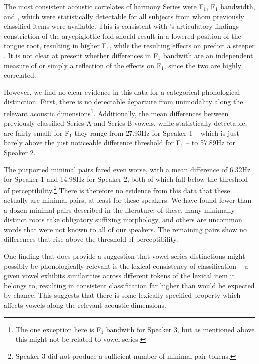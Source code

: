 \documentclass[output=paper,newtxmath,modfonts,nonflat,hidelinks]{langsci/langscibook}
\begin{document}
The most consistent acoustic correlates of harmony Series were F$_1$, F$_1$ bandwidth, and , which were statistically detectable for all subjects from whom previously classified items were available.  This is consistent with \cite{Edmondsonetal2004}'s articulatory findings -- constriction of the aryepiglottic fold should result in a lowered position of the tongue root, resulting in higher F$_1$, while the resulting effects on  predict a steeper .  It is not clear at present whether differences in F$_1$ bandwith are an independent measure of  or simply a reflection of the effects on F$_1$, since the two are highly correlated.  

However, we find no clear evidence in this data for a categorical phonological distinction.  First, there is no detectable departure from unimodality along the relevant acoustic dimensions\footnote{The one exception here is F$_1$ bandwith for Speaker 3, but as mentioned above this might not be related to vowel series.}.  Additionally, the mean differences between previously-classified Series A and Series B vowels, while statistically detectable, are fairly small; for F$_1$ they range from 27.93Hz for Speaker 1 --  which is just barely above the just noticeable difference threshold for F$_1$ \citep{KewleyPort1995} -- to 57.89Hz for Speaker 2.  

The purported minimal pairs fared even worse, with a mean difference of 6.32Hz for Speaker 1 and 14.98Hz for Speaker 2, both of which fall below the threshold of perceptibility.\footnote{Speaker 3 did not produce a sufficient number of minimal pair tokens.}  There is therefore no evidence from this data that these actually are minimal pairs, at least for these speakers.  We have found fewer than a dozen minimal pairs described in the literature; of these, many minimally-distinct roots take obligatory suffixing morphology, and others are uncommon words that were not known to all of our speakers.  The remaining pairs show no differences that rise above the threshold of perceptibility.

One finding that does provide a suggestion that vowel series distinctions might possibly be phonologically relevant is the lexical consistency of classification -- a given vowel exhibits similarities across different tokens of the lexical item it belongs to, resulting in consistent classification far higher than would be expected by chance.  This suggests that there is some lexically-specified property which affects vowels along the relevant acoustic dimensions. 
\end{document}
